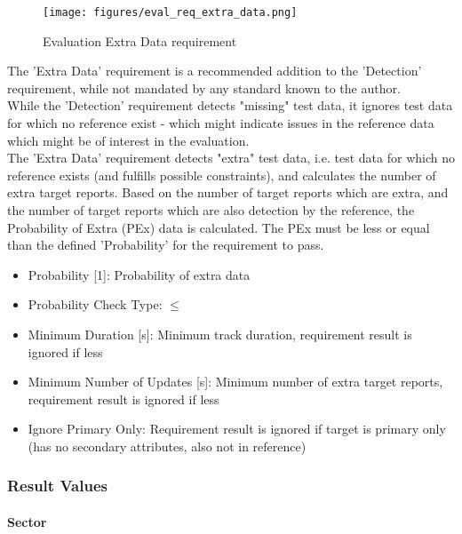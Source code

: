 \begin{figure}[H]
    \texttt{[image: figures/eval\_req\_extra\_data.png]}
  \caption{Evaluation Extra Data requirement}
\end{figure}

The 'Extra Data' requirement is a recommended addition to the 'Detection' requirement, while not mandated by any standard known to the author. \\

While the 'Detection' requirement detects "missing" test data, it ignores test data for which no reference exist - which might indicate issues in the reference data which might be of interest in the evaluation. \\

The 'Extra Data' requirement detects "extra" test data, i.e. test data for which no reference exists (and fulfills possible constraints), and calculates the number of extra target reports. Based on the number of target reports which are extra, and the number of target reports which are also detection by the reference, the Probability of Extra (PEx) data is calculated. The PEx must be less or equal than the defined 'Probability' for the requirement to pass. \\

\begin{itemize}  
\item Probability [1]: Probability of extra data
\item Probability Check Type: $\leq$
\item Minimum Duration [s]: Minimum track duration, requirement result is ignored if less
\item Minimum Number of Updates [s]: Minimum number of extra target reports, requirement result is ignored if less
\item Ignore Primary Only: Requirement result is ignored if target is primary only (has no secondary attributes, also not in reference)
\end{itemize}

\subsubsection{Result Values}

\paragraph{Sector}

